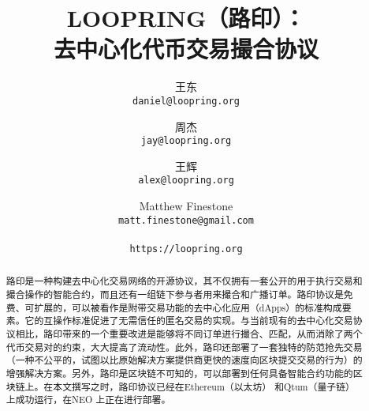 \documentclass[UTF8]{ctexart}
\title{\textbf{LOOPRING（路印）：}\\\textbf{去中心化代币交易撮合协议}}
\author{
  王东\\
  \texttt{daniel@loopring.org}\\
  \and
  	周杰\\
  	\texttt{jay@loopring.org}\\
  	\and
  	王辉\\
  	\texttt{alex@loopring.org}\\
  	\and
  	Matthew Finestone\\
  	\texttt{matt.finestone@gmail.com}\\ 
  \\
  \texttt{https://loopring.org}
 }
\begin{document}
\maketitle


\begin{abstract}
路印是一种构建去中心化交易网络的开源协议，其不仅拥有一套公开的用于执行交易和撮合操作的智能合约，而且还有一组链下参与者用来撮合和广播订单。路印协议是免费、可扩展的，可以被看作是附带交易功能的去中心化应用（dApps）的标准构成要素。它的互操作标准促进了无需信任的匿名交易的实现。与当前现有的去中心化交易协议相比，路印带来的一个重要改进是能够将不同订单进行撮合、匹配，从而消除了两个代币交易对的约束，大大提高了流动性。此外，路印还部署了一套独特的防范抢先交易（一种不公平的，试图以比原始解决方案提供商更快的速度向区块提交交易的行为）的增强解决方案。另外，路印是区块链不可知的，可以部署到任何具备智能合约功能的区块链上。在本文撰写之时，路印协议已经在Ethereum（以太坊） \cite{buterin2017ethereum} \cite{wood2014ethereum} 和Qtum（量子链） \cite{dai2017smart} 上成功运行，在NEO \cite{atterlonn2018distributed} 上正在进行部署。
\end{abstract}
\end{document}
